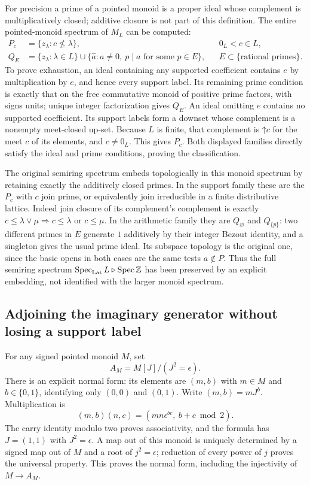 For precision a prime of a pointed monoid is a proper ideal whose
complement is multiplicatively closed; additive closure is not
part of this definition. The entire pointed-monoid spectrum of
$M_L$ can be computed:
\[
 \begin{aligned}
 P_c&=\{z_\lambda:c\not\le\lambda\},&&0_L<c\in L,\\
 Q_E&=\{z_\lambda:\lambda\in L\}
  \cup\{\widehat a:a\ne0,\ p\mid a\text{ for some }p\in E\},
  &&E\subset\{\text{rational primes}\}.
 \end{aligned}
 \tag{AT4}\label{at:eq:monoid-primes}
\]
To prove exhaustion, an ideal containing any supported coefficient
contains $e$ by multiplication by $e$, and hence every support
label. Its remaining prime condition is exactly that on the free
commutative monoid of positive prime factors, with signs units;
unique integer factorization gives $Q_E$. An ideal omitting $e$
contains no supported coefficient. Its support labels form a
downset whose complement is a nonempty meet-closed up-set. Because
$L$ is finite, that complement is $\mathord\uparrow c$ for the
meet $c$ of its elements, and $c\ne0_L$. This gives $P_c$.
Both displayed families directly satisfy the ideal and prime
conditions, proving the classification.

The original semiring spectrum embeds topologically in this monoid
spectrum by retaining exactly the additively closed primes. In
the support family these are the $P_c$ with $c$ join prime, or
equivalently join irreducible in a finite distributive lattice.
Indeed join closure of its complement's complement is exactly
$c\le\lambda\vee\mu\Rightarrow c\le\lambda$ or $c\le\mu$.
In the arithmetic family they are $Q_\varnothing$ and
$Q_{\{p\}}$: two different primes in $E$ generate $1$ additively
by their integer Bezout identity, and a singleton gives the usual
prime ideal. Its subspace topology is the original one, since
the basic opens in both cases are the same tests $a\notin P$.
Thus the full semiring spectrum
$\operatorname{Spec}_{\rm Lat} L\triangleright\operatorname{Spec}\mathbb Z$ has been preserved by an
explicit embedding, not identified with the larger monoid spectrum.

\subsection{Adjoining the imaginary generator without losing a support label}

For any signed pointed monoid $M$, set
\[
 A_M=M[J]/(J^2=\epsilon).
 \tag{AT5}\label{at:eq:imaginary-extension}
\]
There is an explicit normal form: its elements are $(m,b)$ with
$m\in M$ and $b\in\{0,1\}$, identifying only $(0,0)$ and
$(0,1)$. Write $(m,b)=mJ^b$. Multiplication is
\[
 (m,b)(n,c)=(mn\epsilon^{bc},\ b+c\bmod2).
 \tag{AT6}\label{at:eq:normal-product}
\]
The carry identity modulo two proves associativity, and the
formula has $J=(1,1)$ with $J^2=\epsilon$. A map out of this
monoid is uniquely determined by a signed map out of $M$ and
a root of $j^2=\epsilon$; reduction of every power of $j$ proves
the universal property. This proves the normal form, including
the injectivity of $M\to A_M$.

